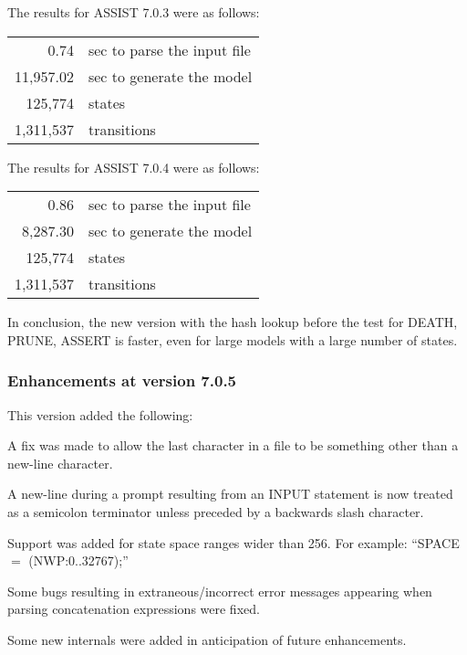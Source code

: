 The results for ASSIST 7.0.3 were as follows:
\begin{center}\begin{tabular}{rl}
             0.74 & sec to parse the input file \\
        11,957.02 & sec to generate the model \\
          125,774 & states \\
        1,311,537 & transitions \\
\end{tabular}\end{center}

The results for ASSIST 7.0.4 were as follows:
\begin{center}\begin{tabular}{rl}
             0.86 & sec to parse the input file \\
         8,287.30 & sec to generate the model \\
          125,774 & states \\
        1,311,537 & transitions \\
\end{tabular}\end{center}

In conclusion, the new version with the hash lookup before the
test for DEATH, PRUNE, ASSERT is faster, even for large models with
a large number of states.

\subsubsection{Enhancements at version 7.0.5}

This version added the following:
\begin{indenteditems}
\item A fix was made to allow the last character in a file to be
      something other than a new-line character.
\item A new-line during a prompt resulting from an INPUT statement is
      now treated as a semicolon terminator unless preceded by a backwards
      slash character.
\item Support was added for state space ranges wider than 256.   For example:
      ``SPACE $=$ (NWP:0..32767);''
\item Some bugs resulting in extraneous/incorrect error messages appearing
      when parsing concatenation expressions were fixed.
\item Some new internals were added in anticipation of future enhancements.
\end{indenteditems}

